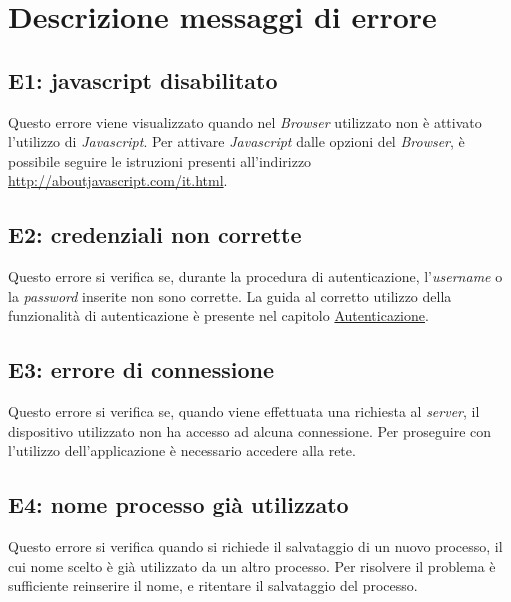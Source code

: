 \section{Descrizione messaggi di errore}
\label{errori}

\subsection{E1: javascript disabilitato}
\label{e1}
Questo errore viene visualizzato quando nel \textit{Browser} utilizzato non è attivato l'utilizzo di \textit{Javascript}.
Per attivare \textit{Javascript} dalle opzioni del \textit{Browser}, è possibile seguire le istruzioni presenti all'indirizzo \url{http://aboutjavascript.com/it.html}.

\subsection{E2: credenziali non corrette}
\label{e2}
Questo errore si verifica se, durante la procedura di autenticazione, l'\textit{username} o la \textit{password} inserite non sono corrette.
La guida al corretto utilizzo della funzionalità di autenticazione è presente nel capitolo \hyperref[autenticazione]{Autenticazione}.

\subsection{E3: errore di connessione}
\label{e3}
Questo errore si verifica se, quando viene effettuata una richiesta al \textit{server}, il dispositivo utilizzato non ha accesso ad alcuna connessione.
Per proseguire con l'utilizzo dell'applicazione è necessario accedere alla rete.

\subsection{E4: nome processo già utilizzato}
\label{e4}
Questo errore si verifica quando si richiede il salvataggio di un nuovo processo, il cui nome scelto è già utilizzato da un altro processo.
Per risolvere il problema è sufficiente reinserire il nome, e ritentare il salvataggio del processo.

